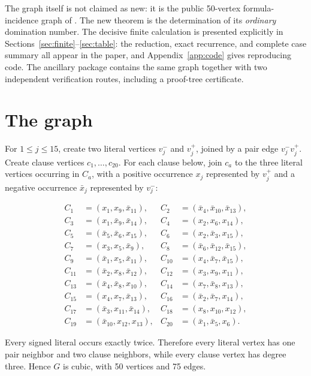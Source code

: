 \documentclass[11pt]{article}
\theoremstyle{definition}
\theoremstyle{remark}
\begin{document}
The graph itself is not claimed as new: it is the public 50-vertex formula-incidence graph of \cite{TxGraffiti2026}.  The new theorem is the determination of its \emph{ordinary} domination number.  The decisive finite calculation is presented explicitly in Sections~\ref{sec:finite}--\ref{sec:table}: the reduction, exact recurrence, and complete case summary all appear in the paper, and Appendix~\ref{app:code} gives reproducing code.  The ancillary package contains the same graph together with two independent verification routes, including a proof-tree certificate.

\section{The graph}\label{sec:graph}
For \(1\leq j\leq15\), create two literal vertices \(v_j^-\) and \(v_j^+\), joined by a pair edge \(v_j^-v_j^+\).  Create clause vertices \(c_1,\ldots,c_{20}\).  For each clause below, join \(c_a\) to the three literal vertices occurring in \(C_a\), with a positive occurrence \(x_j\) represented by \(v_j^+\) and a negative occurrence \(\bar x_j\) represented by \(v_j^-\):

\begin{align*}
C_1&=(x_1,x_9,\bar x_{11}), & C_2&=(\bar x_4,\bar x_{10},\bar x_{13}),\\
C_3&=(x_1,\bar x_9,\bar x_{14}), & C_4&=(x_2,x_6,x_{14}),\\
C_5&=(\bar x_5,\bar x_6,x_{15}), & C_6&=(x_2,\bar x_3,x_{15}),\\
C_7&=(x_3,x_5,\bar x_9), & C_8&=(\bar x_6,\bar x_{12},\bar x_{15}),\\
C_9&=(\bar x_1,x_5,\bar x_{11}), & C_{10}&=(x_4,\bar x_7,\bar x_{15}),\\
C_{11}&=(\bar x_2,x_8,\bar x_{12}), & C_{12}&=(x_3,x_9,x_{11}),\\
C_{13}&=(\bar x_4,\bar x_8,x_{10}), & C_{14}&=(x_7,\bar x_8,x_{13}),\\
C_{15}&=(x_4,x_7,\bar x_{13}), & C_{16}&=(\bar x_2,\bar x_7,x_{14}),\\
C_{17}&=(\bar x_3,x_{11},\bar x_{14}), & C_{18}&=(x_8,x_{10},x_{12}),\\
C_{19}&=(\bar x_{10},x_{12},x_{13}), & C_{20}&=(\bar x_1,\bar x_5,x_6).
\end{align*}

Every signed literal occurs exactly twice.  Therefore every literal vertex has one pair neighbor and two clause neighbors, while every clause vertex has degree three.  Hence \(G\) is cubic, with 50 vertices and 75 edges.
\end{document}
